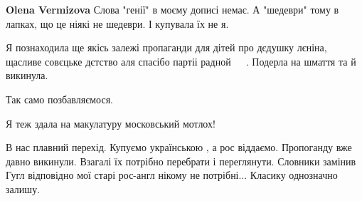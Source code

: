 \begin{itemize}
\begin{itemize}
\textbf{Olena Vermizova} Слова "генії" в моєму дописі немає. А "шедеври" тому в лапках, що це ніякі не шедеври. І купувала їх не я.

\end{itemize}

 

Я познаходила ще якісь залежі пропаганди для дітей про дєдушку лєніна, щасливе
совєцьке дєтство аля спасібо партіі радной 🤮🤮🤮 . Подерла на шмаття та й
викинула.


 
Так само позбавляємося.

 
Я теж здала на макулатуру московський мотлох!

 

В нас плавний перехід. Купуємо українською , а рос віддаємо. Пропоганду вже
давно викинули. Взагалі їх потрібно перебрати і переглянути. Словники замінив
Гугл відповідно мої старі рос-англ нікому не потрібні... Класику однозначно
залишу.

\end{itemize}

